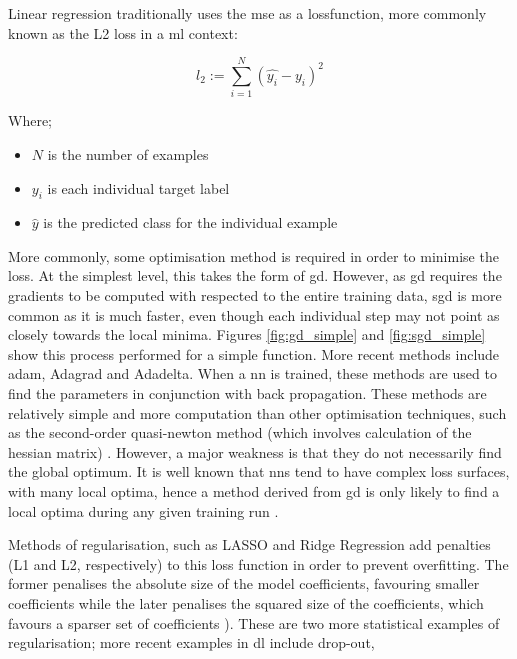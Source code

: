 
Linear regression traditionally uses the  \gls{mse} as a \gls{lossfunction}, more commonly known as the L2 loss in a \gls{ml} context:

\begin{equation}
l_2 := \sum_{i = 1}^N (\hat{y_i} - y_i)^2
\end{equation}

Where;

\begin{itemize}
\item $N$ is the number of examples  
\item $y_i$ is each individual target label  
\item $\hat{y}$ is the predicted class for the individual example 
\end{itemize}

More commonly, some optimisation method is required in order to minimise the \gls{loss}.  At the simplest level, this takes the form of \gls{gd}. However, as \gls{gd} requires the gradients to be computed with respected to the entire training data, \gls{sgd} is more common as it is much faster, even though each individual step may not point as closely towards the local minima. Figures  \ref{fig:gd_simple} and \ref{fig:sgd_simple} show this process performed for a simple function. More recent methods include  \gls{adam}, Adagrad and Adadelta. When a \gls{nn} is trained, these methods are used to find the parameters in conjunction with back propagation. These methods are relatively simple and more computation than other optimisation techniques, such as the second-order quasi-newton method (which involves calculation of the hessian matrix) \cite{quasi_netwon}. However, a major weakness is that they do not necessarily find the global optimum. It is well known that \gls{nn}s tend to have complex loss surfaces, with many local optima, hence a method derived from \gls{gd} is only likely to find a local optima during any given training run \cite{gd_optima}.   


Methods of regularisation, such as LASSO and Ridge Regression add penalties (L1 and L2, respectively) to this loss function in order to prevent overfitting. The former penalises the absolute size of the model coefficients,  favouring smaller coefficients while the later penalises the squared size of the coefficients, which favours a sparser set of coefficients \cite{ridge_lasso}). These are two more statistical examples of regularisation; more recent examples in \gls{dl} include drop-out,  %
\bigskip

